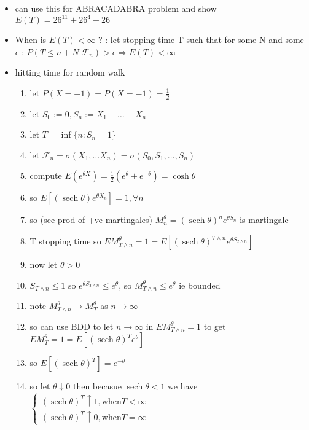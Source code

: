 \documentclass[10pt,landscape,a4paper]{article}
\newcommand{\myFF}{\mathcal{F}}
\newcommand{\sech}{ \operatorname{sech} }
\begin{document}
\begin{multicols*}{3}
\begin{spacing}{0.5}
\begin{itemize}
\item can use this for ABRACADABRA  problem and show $E(T)=26^{11} + 26^4 +26$

\item \colorbox{green!10}{When is $E(T) < \infty$ ?} : let stopping time T such that for some N and some $\epsilon$ : $P(T \le n + N| \myFF_n) > \epsilon \Rightarrow E(T) < \infty$

\item \colorbox{green!10}{hitting time for random walk}
\begin{enumerate}
\item let $P(X=+1)=P(X=-1)=\frac{1}{2}$
\item let $S_0 := 0, S_n := X_1 + \ldots + X_n$
\item let $T = \inf \{n : S_n =1 \}$
\item let $\myFF_{n} = \sigma(X_1, \ldots X_n) = \sigma(S_0,S_1, \ldots ,S_n)$
\item compute $E(e^{\theta X})= \frac{1}{2} ( e^{\theta} + e^{- \theta} ) = \cosh \theta$
\item so $E[(\sech \theta)e^{\theta X_n}]=1 , \forall n$
\item so (see prod of +ve martingales)  $M_n^{\theta}= {(\sech \theta)}^n e^{\theta S_n}$ is martingale

\item T stopping time so $EM_{T \wedge n}^{\theta}=1 = E[ {(\sech \theta)}^{T \wedge n} e^{\theta S_{T \wedge n}}]$

\item now let $\theta > 0$

\item $S_{T \wedge n} \le 1$ so $e^{\theta S_{T \wedge n}} \le e^{\theta}$, so $M_{T \wedge n}^{\theta} \le e^{\theta}$ ie bounded

\item note $ M_{T \wedge n}^{\theta} \rightarrow M_T^{\theta}$ as $ n \rightarrow \infty$

\item so can use BDD to let $ n \rightarrow \infty$ in $EM_{T \wedge n}^{\theta}=1$ to get $EM_{T }^{\theta}=1=E[ {(\sech \theta)}^T e^{\theta}]$

\item so $E[ {(\sech \theta)}^T ] =  e^{-\theta}$
\item so let $ \theta \downarrow 0$ then becasue $\sech \theta < 1$ we have $\begin{cases}  {(\sech \theta)}^T \uparrow 1 , \text{when} T < \infty \\ {(\sech \theta)}^T \uparrow 0 , \text{when} T = \infty \end{cases}$


\end{enumerate}
\end{itemize}
\end{spacing}
\end{multicols*}
\end{document}
